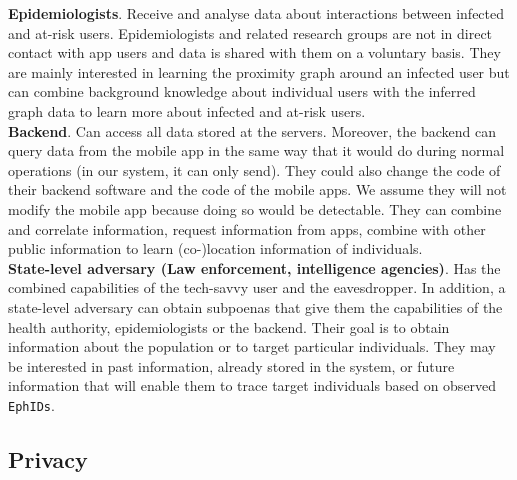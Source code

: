 \documentclass[12pt,a4paper]{article}
\begin{document}
\textbf{Epidemiologists}. Receive and analyse data about interactions between infected and at-risk users. Epidemiologists and related research groups are not in direct contact with app users and data is shared with them on a voluntary basis. They are mainly interested in learning the proximity graph around an infected user but can combine background knowledge about individual users with the inferred graph data to learn more about infected and at-risk users.\\[0.3cm]
\textbf{Backend}. Can access all data stored at the servers. Moreover, the backend can query data from the mobile app in the same way that it would do during normal operations (in our system, it can only send). They could also change the code of their backend software and the code of the mobile apps. We assume they will not modify the mobile app because doing so would be detectable. They can combine and correlate information, request information from apps, combine with other public information to learn (co-)location information of individuals.\\[0.3cm]
\textbf{State-level adversary (Law enforcement, intelligence agencies)}. Has the combined
capabilities of the tech-savvy user and the eavesdropper. In addition, a state-level adversary can obtain subpoenas that give them the capabilities of the health authority, epidemiologists or the backend. Their goal is to obtain information about the population or to target particular individuals. They may be interested in past information, already stored in the system, or future information that will enable them to trace target individuals based on observed \texttt{EphIDs}.
\subsection*{Privacy}
\end{document}
